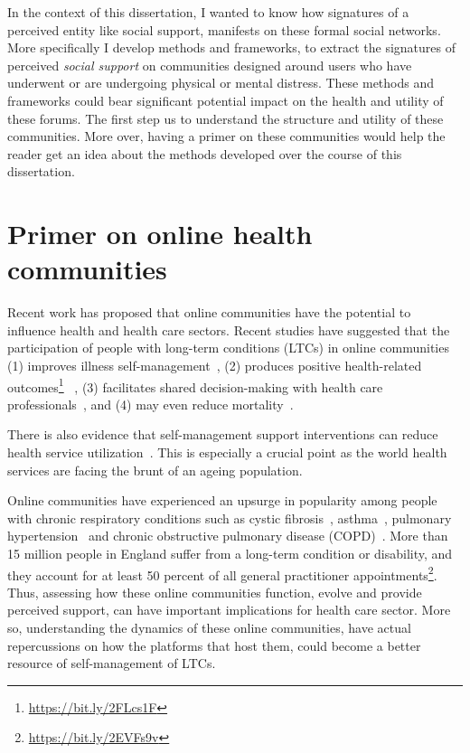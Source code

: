 In the context of this dissertation, I wanted to know how signatures of a perceived entity like social support,  manifests on these formal social networks. More specifically I  develop methods and frameworks, to extract the signatures of perceived \textsl{social support} on communities designed around users who have underwent or are undergoing physical or mental distress. These methods and frameworks could bear significant potential impact on the health and utility of these forums. The first step us to understand the structure and utility of these communities. More over, having a primer on these communities would help the reader get an idea about the methods developed over the course of this dissertation. 

\section{Primer on online health communities}
\label{sec:primer}
Recent work has proposed that online communities have the potential to influence health and health care sectors. Recent studies have suggested that the participation of people with long-term conditions (LTCs) in online communities (1) improves illness self-management~\cite{allen2016long}, (2) produces positive health-related outcomes\footnote{\url{https://bit.ly/2FLcs1F}}~\cite{mo2012developing,pendry2015individual} , (3) facilitates shared decision-making with health care professionals~\cite{bartlett2011investigation,izuka2017stroke}, and (4) may even reduce mortality~\cite{hobbs2016online}.

There is also evidence that self-management support interventions can reduce health service utilization~\cite{panagioti2014self,taylor2014rapid}. This is especially a crucial point as the world health services are facing the brunt of an ageing population.

Online communities have experienced an upsurge in popularity among people with chronic respiratory conditions such as cystic fibrosis~\cite{kirk2016exploration}, asthma~\cite{stewart2011online}, pulmonary hypertension~\cite{matura2013virtual} and chronic obstructive pulmonary disease (COPD)~\cite{wentzer2013narratives}. More than 15 million people in England suffer from a long-term condition or disability, and they account for at least 50 percent of all general practitioner appointments\footnote{\url{https://bit.ly/2EVFs9v}}. Thus, assessing how these online communities function, evolve and provide perceived support, can have important implications for health care sector. More so, understanding the dynamics of these online communities, have actual repercussions on how the platforms that host them, could become a better resource of self-management of LTCs.

